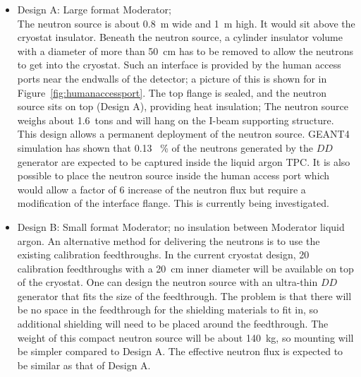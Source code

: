 \begin{itemize}
\item Design A: Large format Moderator; \\
The neutron source is about 0.8~m wide and 1~m high. It would sit above the cryostat insulator. Beneath the neutron source, a cylinder insulator volume with a diameter of more than 50~cm has to be removed to allow the neutrons to get into the cryostat. Such an interface is provided by the human access ports near the endwalls of the detector; a picture of this is shown for  in Figure~\ref{fig:humanaccessport}. The top flange is sealed, and the neutron source sits on top (Design A), providing heat insulation; The neutron source weighs about 1.6~tons and will hang on the I-beam supporting structure. This design allows a permanent deployment of the neutron source. GEANT4 simulation has shown that 0.13 ~\% of the neutrons generated by the $DD$ generator are expected to be captured inside the liquid argon TPC. It is also possible to place the neutron source inside the human access port which would allow a factor of 6 increase of the neutron flux but require a modification of the interface flange. This is currently being investigated.

\item Design B: Small format Moderator; no insulation between Moderator liquid argon. An alternative method for delivering the neutrons is to use the existing calibration feedthroughs. In the current cryostat design, 20 calibration feedthroughs with a 20~cm inner diameter will be available on top of the cryostat. One can design the neutron source with an ultra-thin $DD$ generator that fits the size of the feedthrough. The problem is that there will be no space in the feedthrough for the shielding materials to fit in, so additional shielding will need to be placed around the feedthrough. The weight of this compact neutron source will be about 140~kg, so mounting will be simpler compared to Design A. The effective neutron flux is expected to be similar as that of Design A. 
\end{itemize}

